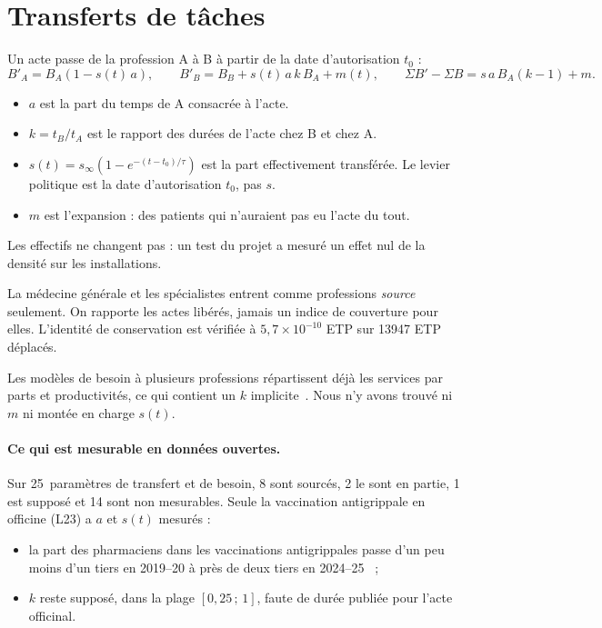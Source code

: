 \documentclass[11pt]{article}
\begin{document}
\section{Transferts de tâches}\label{sec:transferts}
Un acte passe de la profession A à B à partir de la date d'autorisation $t_0$ :
\[
B'_A=B_A(1-s(t)\,a),\qquad B'_B=B_B+s(t)\,a\,k\,B_A+m(t),\qquad \Sigma B'-\Sigma B=s\,a\,B_A(k-1)+m .
\]
\begin{itemize}
  \item $a$ est la part du temps de A consacrée à l'acte.
  \item $k=t_B/t_A$ est le rapport des durées de l'acte chez B et chez A.
  \item $s(t)=s_\infty(1-e^{-(t-t_0)/\tau})$ est la part effectivement transférée. Le levier politique est la date
        d'autorisation $t_0$, pas $s$.
  \item $m$ est l'expansion : des patients qui n'auraient pas eu l'acte du tout.
\end{itemize}
Les effectifs ne changent pas : un test du projet a mesuré un effet nul de la densité sur les installations.

La médecine générale et les spécialistes entrent comme professions \emph{source} seulement. On rapporte les actes
libérés, jamais un indice de couverture pour elles. L'identité de conservation est vérifiée à $5{,}7\times10^{-10}$
ETP\mesure{} sur \num{13947} ETP déplacés.

Les modèles de besoin à plusieurs professions répartissent déjà les services par parts et productivités, ce qui
contient un $k$ implicite~\citep{mackenzie2019}. Nous n'y avons trouvé ni $m$ ni montée en charge $s(t)$.

\paragraph{Ce qui est mesurable en données ouvertes.} Sur 25~paramètres de transfert et de besoin, 8 sont sourcés, 2
le sont en partie, 1 est supposé et 14 sont non mesurables\mesure{}. Seule la vaccination antigrippale en officine
(L23) a $a$ et $s(t)$ mesurés :
\begin{itemize}
  \item la part des pharmaciens dans les vaccinations antigrippales passe d'un peu moins d'un tiers en 2019--20 à
        près de deux tiers en 2024--25~\citep{ccomptes2026} ;
  \item $k$ reste supposé, dans la plage $[0{,}25\,;\,1]$\suppose{}, faute de durée publiée pour l'acte officinal.
\end{itemize}
\end{document}
